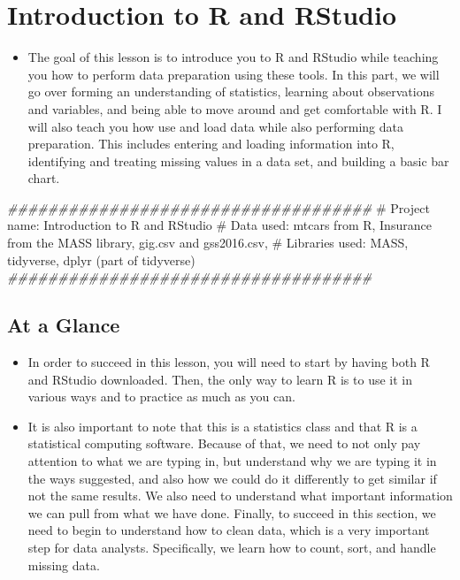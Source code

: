 \documentclass[
  letterpaper,
  DIV=11,
  numbers=noendperiod]{scrreprt}
\newenvironment{Shaded}{\begin{snugshade}}{\end{snugshade}}
\newcommand{\CommentTok}[1]{\textcolor[rgb]{0.37,0.37,0.37}{#1}}
\newcommand{\DocumentationTok}[1]{\textcolor[rgb]{0.37,0.37,0.37}{\textit{#1}}}
\providecommand{\tightlist}{%
  \setlength{\itemsep}{0pt}\setlength{\parskip}{0pt}}\usepackage{longtable,booktabs,array}
\begin{document}

\chapter{Introduction to R and
RStudio}\label{introduction-to-r-and-rstudio}

\begin{itemize}
\tightlist
\item
  The goal of this lesson is to introduce you to R and RStudio while
  teaching you how to perform data preparation using these tools. In
  this part, we will go over forming an understanding of statistics,
  learning about observations and variables, and being able to move
  around and get comfortable with R. I will also teach you how use and
  load data while also performing data preparation. This includes
  entering and loading information into R, identifying and treating
  missing values in a data set, and building a basic bar chart.
\end{itemize}

\begin{Shaded}
\begin{Highlighting}[]
\DocumentationTok{\#\#\#\#\#\#\#\#\#\#\#\#\#\#\#\#\#\#\#\#\#\#\#\#\#\#\#\#\#\#\#\#\#\#\#\#}
\CommentTok{\# Project name: Introduction to R and RStudio}
\CommentTok{\# Data used: mtcars from R, Insurance from the MASS library, gig.csv and gss2016.csv, }
\CommentTok{\# Libraries used: MASS, tidyverse, dplyr (part of tidyverse)}
\DocumentationTok{\#\#\#\#\#\#\#\#\#\#\#\#\#\#\#\#\#\#\#\#\#\#\#\#\#\#\#\#\#\#\#\#\#\#\#\#}
\end{Highlighting}
\end{Shaded}

\section{At a Glance}\label{at-a-glance}

\begin{itemize}
\tightlist
\item
  In order to succeed in this lesson, you will need to start by having
  both R and RStudio downloaded. Then, the only way to learn R is to use
  it in various ways and to practice as much as you can.
\item
  It is also important to note that this is a statistics class and that
  R is a statistical computing software. Because of that, we need to not
  only pay attention to what we are typing in, but understand why we are
  typing it in the ways suggested, and also how we could do it
  differently to get similar if not the same results. We also need to
  understand what important information we can pull from what we have
  done. Finally, to succeed in this section, we need to begin to
  understand how to clean data, which is a very important step for data
  analysts. Specifically, we learn how to count, sort, and handle
  missing data.
\end{itemize}
\end{document}
